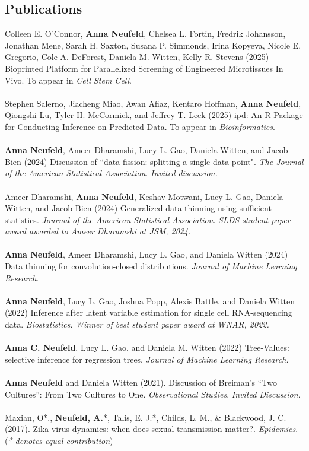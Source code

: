 \documentclass[margin, 10pt]{res}
\begin{document}
\begin{resume}
\section{Publications} 
Colleen E. O'Connor, \textbf{Anna Neufeld}, Chelsea L. Fortin, Fredrik Johansson, Jonathan Mene, Sarah H. Saxton, Susana P. Simmonds, Irina Kopyeva, Nicole E. Gregorio, Cole A. DeForest, Daniela M. Witten, Kelly R. Stevens (2025) Bioprinted Platform for Parallelized Screening of Engineered Microtissues In Vivo. To appear in \emph{Cell Stem Cell}. \\
\\
Stephen Salerno, Jiacheng Miao, Awan Afiaz, Kentaro Hoffman, \textbf{Anna Neufeld}, Qiongshi Lu, Tyler H. McCormick, and Jeffrey T. Leek (2025) ipd: An R Package for Conducting Inference on Predicted Data. To appear in \emph{Bioinformatics}. \\
\\
\textbf{Anna Neufeld}, Ameer Dharamshi, Lucy L. Gao, Daniela Witten, and Jacob Bien (2024) Discussion of ``data fission: splitting a single data point". \emph{The Journal of the American Statistical Association}. \emph{Invited discussion.}  \\
\\
Ameer Dharamshi, \textbf{Anna Neufeld}, Keshav Motwani, Lucy L. Gao, Daniela Witten, and Jacob Bien (2024) Generalized data thinning using sufficient statistics. \emph{Journal of the American Statistical Association}. \emph{SLDS student paper award awarded to Ameer Dharamshi at JSM, 2024.}  \\
\\
\textbf{Anna Neufeld}, Ameer Dharamshi, Lucy L. Gao, and Daniela Witten (2024) Data thinning for convolution-closed distributions. \emph{Journal of Machine Learning Research}. \\
\\
\textbf{Anna Neufeld}, Lucy L. Gao, Joshua Popp, Alexis Battle, and Daniela Witten (2022) Inference after latent variable estimation for single cell RNA-sequencing data. \emph{Biostatistics}. \emph{Winner of best student paper award at WNAR, 2022.}  \\
\\
\textbf{Anna C. Neufeld}, Lucy L. Gao, and Daniela M. Witten (2022) Tree-Values: selective inference for regression trees. \emph{Journal of Machine Learning Research.}\\
\\
\textbf{Anna Neufeld} and Daniela Witten (2021). Discussion of Breiman’s “Two Cultures”: From Two Cultures to One. \emph{Observational Studies}. \emph{Invited Discussion}.   \\
\\
Maxian, O*., \textbf{Neufeld, A.}*, Talis, E. J.*, Childs, L. M., \& Blackwood, J. C. (2017). Zika virus dynamics: when does sexual transmission matter?. \emph{Epidemics}. \\
\small
(\emph{* denotes equal contribution})
\normalsize


\end{resume}
\end{document}

